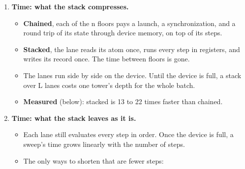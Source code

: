 \begin{enumerate}
\begin{itemize}
\item Each step's width follows from its operands' widths.
\item A register the imprint can show is never negative carries that fact forward:

\begin{itemize}
\item a field read unsigned, a constant, an absolute value, a gcd, a table entry;
\item a sum, product, quotient or xor of two such registers;
\item an and with one such register.
\end{itemize}
\item With that fact, an and is no wider than its never-negative operand, and an xor of two never-negative registers is no wider than the wider one. A stack of rounds on fixed-width words then keeps its words at their width through every floor, instead of growing a bit per round.
\item Every width is checked against the values: the bitwise oracle rebuilds each output bit from the raw fields and requires the sign to hold 64 bits past the written width.
\end{itemize}
\item \textbf{Time: what the stack compresses.}

\begin{itemize}
\item \textbf{Chained}, each of the n floors pays a launch, a synchronization, and a round trip of its state through device memory, on top of its steps.
\item \textbf{Stacked}, the lane reads its atom once, runs every step in registers, and writes its record once. The time between floors is gone.
\item The lanes run side by side on the device. Until the device is full, a stack over L lanes costs one tower's depth for the whole batch.
\item \textbf{Measured} (below): stacked is 13 to 22 times faster than chained.
\end{itemize}
\item \textbf{Time: what the stack leaves as it is.}

\begin{itemize}
\item Each lane still evaluates every step in order. Once the device is full, a sweep's time grows linearly with the number of steps.
\item The only ways to shorten that are fewer steps:


\end{itemize}
\end{enumerate}
